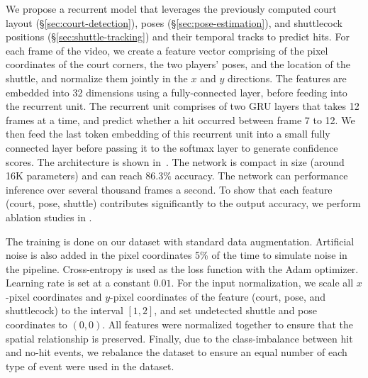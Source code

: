 We propose a recurrent model that leverages the previously computed court layout (\S\ref{sec:court-detection}), poses (\S\ref{sec:pose-estimation}), and shuttlecock positions (\S\ref{sec:shuttle-tracking}) and their temporal tracks to predict hits. For each frame of the video, we create a feature vector comprising of the pixel coordinates of the court corners, the two players' poses, and the location of the shuttle, and normalize them jointly in the $x$ and $y$ directions. The features are embedded into 32 dimensions using a fully-connected layer, before feeding into the recurrent unit. The recurrent unit comprises of two GRU layers that takes 12 frames at a time, and predict whether a hit occurred between frame 7 to 12. We then feed the last token embedding of this recurrent unit into a small fully connected layer before passing it to the softmax layer to generate confidence scores. The architecture is shown in~. The network is compact in size (around 16K parameters) and can reach $86.3\%$ accuracy. The network can performance inference over several thousand frames a second. To show that each feature (court, pose, shuttle) contributes significantly to the output accuracy, we perform ablation studies in . 

The training is done on our dataset with standard data augmentation. Artificial noise is also added in the pixel coordinates 5\% of the time to simulate noise in the pipeline. Cross-entropy is used as the loss function with the Adam optimizer. Learning rate is set at a constant $0.01$. For the input normalization, we scale all $x$-pixel coordinates and $y$-pixel coordinates of the feature (court, pose, and shuttlecock) to the interval $[1, 2]$, and set undetected shuttle and pose coordinates to $(0, 0)$. All features were normalized together to ensure that the spatial relationship is preserved. Finally, due to the class-imbalance between hit and no-hit events, we rebalance the dataset to ensure an equal number of each type of event were used in the dataset.






